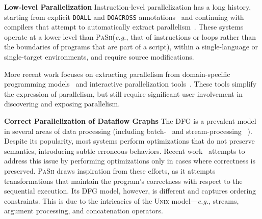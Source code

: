 \documentclass[sigplan, review, screen, anonymous]{acmart}
\newcommand{\eg}{{\em e.g.}, }
\newcommand{\heading}[1]{\vspace{4pt}\noindent\textbf{#1}\enspace}
\newcommand{\ttt}[1]{\texttt{#1}}
\newcommand{\kk}[1]{[{\color{magenta}kk: #1}]}
\newcommand{\sys}{{\scshape PaSh}\xspace}
\newcommand{\unix}{{\scshape Unix}\xspace}
\begin{document}
\heading{Low-level Parallelization}
Instruction-level parallelization has a long history, starting from explicit \ttt{DOALL} and \ttt{DOACROSS} annotations~\cite{par1, par2} and continuing with compilers that attempt to automatically extract parallelism~\cite{padua1993polaris,hall1996maximizing}.
These systems operate at a lower level than \sys (\eg that of instructions or loops rather than the boundaries of programs that are part of a script), within a single-language or single-target environments, and require source modifications.

More recent work focuses on extracting parallelism from domain-specific programming models~\cite{cilk5, streamIt, galois} and interactive parallelization tools~\cite{parascope, ipat}.
These tools simplify the expression of parallelism, but still require significant user involvement in discovering and exposing parallelism.

\heading{Correct Parallelization of Dataflow Graphs}
The DFG is a prevalent model in several areas of data processing (including batch-~\cite{mapreduce:08, spark:12} and stream-processing ~\cite{murray2013naiad, carbone2015flink}).
Despite its popularity, most systems perform optimizations that do not preserve semantics, introducing subtle erroneous behaviors.
Recent work~\cite{HSSGG2014, SHGW2015, MSAIT2019} attempts to address this issue by performing optimizations only in cases where correctness is preserved.
\sys draws inspiration from these efforts, as it attempts transformations that maintain the program's correctness with respect to the sequential execution.
Its  DFG model, however, is different and captures ordering constraints.
This is due to the intricacies of the \unix model---\eg streams, argument processing, and concatenation operators.

\end{document}
